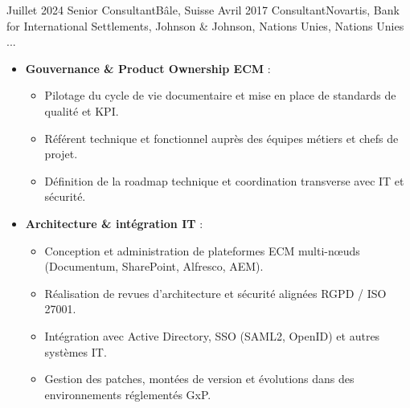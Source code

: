 %
%
%

\begin{experiences}

\consultantexperience
    {Juillet 2024} {Senior Consultant}{}{Bâle, Suisse}
    {Avril 2017}    {Consultant}{Novartis, Bank for International Settlements, Johnson \& Johnson, Nations Unies, Nations Unies ...} {
        \begin{itemize}[left=0pt,label={},itemsep=0.5em]

          \item \textbf{Gouvernance \& Product Ownership ECM} :
            \begin{itemize}[itemsep=0.2em,topsep=0.2em,parsep=0pt]
              \small
              \item Pilotage du cycle de vie documentaire et mise en place de standards de qualité et KPI.
              \item Référent technique et fonctionnel auprès des équipes métiers et chefs de projet.
              \item Définition de la roadmap technique et coordination transverse avec IT et sécurité.
            \end{itemize}

          \item \textbf{Architecture \& intégration IT} :
            \begin{itemize}[itemsep=0.2em,topsep=0.2em,parsep=0pt]
              \small
              \item Conception et administration de plateformes ECM multi-nœuds (Documentum, SharePoint, Alfresco, AEM).
              \item Réalisation de revues d’architecture et sécurité alignées RGPD / ISO 27001.
              \item Intégration avec Active Directory, SSO (SAML2, OpenID) et autres systèmes IT.
              \item Gestion des patches, montées de version et évolutions dans des environnements réglementés GxP.
            \end{itemize}


\end{itemize}}
\end{experiences}
